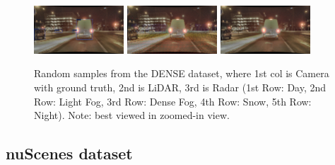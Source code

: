 \documentclass[report.tex]{subfiles}
\begin{document}
\begin{figure}[ht!]
            \includegraphics[width=0.3\textwidth]{images/datasets/dense/samples/night/2018-02-09_18-50-50_00300.png}\hfill
            \includegraphics[width=0.3\textwidth]{images/datasets/dense/samples/night/night_lidar.png}\hfill
            \includegraphics[width=0.3\textwidth]{images/datasets/dense/samples/night/night_radar.png}
          
            \caption{Random samples from the DENSE dataset, where 1st col is Camera with ground truth, 2nd is LiDAR, 3rd is Radar (1st Row: Day, 2nd Row: Light Fog, 3rd Row: Dense Fog, 4th Row: Snow, 5th Row: Night). Note: best viewed in zoomed-in view.}
            \label{fig:dense_samples}
          \end{figure}
          


    \subsection{nuScenes dataset}

\end{document}
